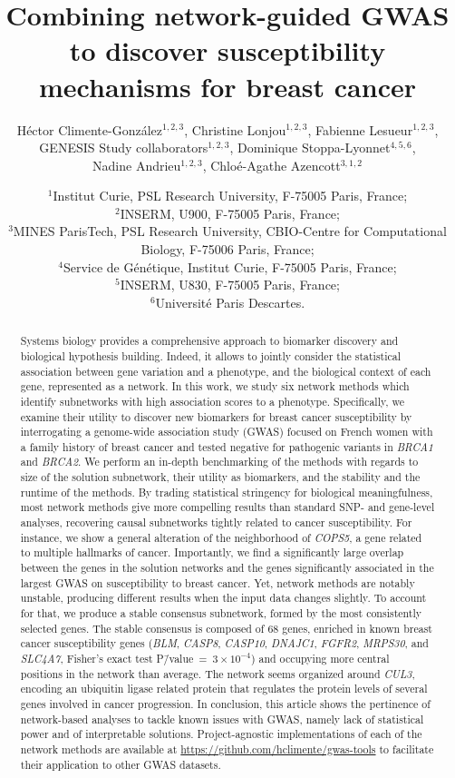 \documentclass[twocolumn, 11pt]{article}
\title{Combining network-guided GWAS to discover susceptibility mechanisms for breast cancer}
\author{Héctor Climente-González$^{1,2,3}$, Christine Lonjou$^{1,2,3}$, Fabienne Lesueur$^{1,2,3}$, \\
GENESIS Study collaborators$^{1,2,3}$, Dominique Stoppa-Lyonnet$^{4,5,6}$, \\
Nadine Andrieu$^{1,2,3}$, Chloé-Agathe Azencott$^{3,1,2}$}
\date{$^{1}$Institut Curie, PSL Research University, F-75005 Paris, France;\\
  $^{2}$INSERM, U900, F-75005 Paris, France;\\
  $^{3}$MINES ParisTech, PSL Research University, CBIO-Centre for Computational Biology, F-75006 Paris, France;\\
  $^{4}$Service de Génétique, Institut Curie, F-75005 Paris, France;\\
  $^{5}$INSERM, U830, F-75005 Paris, France;\\
  $^{6}$Université Paris Descartes.\\
}
\begin{document}
\onecolumn
\maketitle

\begin{abstract}
Systems biology provides a comprehensive approach to biomarker discovery and biological hypothesis building. Indeed, it allows to jointly consider the statistical association between gene variation and a phenotype, and the biological context of each gene, represented as a network. In this work, we study six network methods which identify subnetworks with high association scores to a phenotype. Specifically, we examine their utility to discover new biomarkers for breast cancer susceptibility by interrogating a genome-wide association study (GWAS) focused on French women with a family history of breast cancer and tested negative for pathogenic variants in \emph{BRCA1} and \emph{BRCA2}. We perform an in-depth benchmarking of the methods with regards to size of the solution subnetwork, their utility as biomarkers, and the stability and the runtime of the methods. By trading statistical stringency for biological meaningfulness, most network methods give more compelling results than standard SNP- and gene-level analyses, recovering causal subnetworks tightly related to cancer susceptibility. For instance, we show a general alteration of the neighborhood of \emph{COPS5}, a gene related to multiple hallmarks of cancer. Importantly, we find a significantly large overlap between the genes in the solution networks and the genes significantly associated in the largest GWAS on susceptibility to breast cancer. Yet, network methods are notably unstable, producing different results when the input data changes slightly. To account for that, we produce a stable consensus subnetwork, formed by the most consistently selected genes. The stable consensus is composed of 68 genes, enriched in known breast cancer susceptibility genes (\emph{BLM}, \emph{CASP8}, \emph{CASP10}, \emph{DNAJC1}, \emph{FGFR2}, \emph{MRPS30}, and \emph{SLC4A7}, Fisher's exact test P\=/value~=~$3 \times 10^{-4}$) and occupying more central positions in the network than average. The network seems organized around \emph{CUL3}, encoding an ubiquitin ligase related protein that regulates the protein levels of several genes involved in cancer progression. In conclusion, this article shows the pertinence of network-based analyses to tackle known issues with GWAS, namely lack of statistical power and of interpretable solutions. Project-agnostic implementations of each of the network methods are available at \url{https://github.com/hclimente/gwas-tools} to facilitate their application to other GWAS datasets.
\end{abstract}
\end{document}
